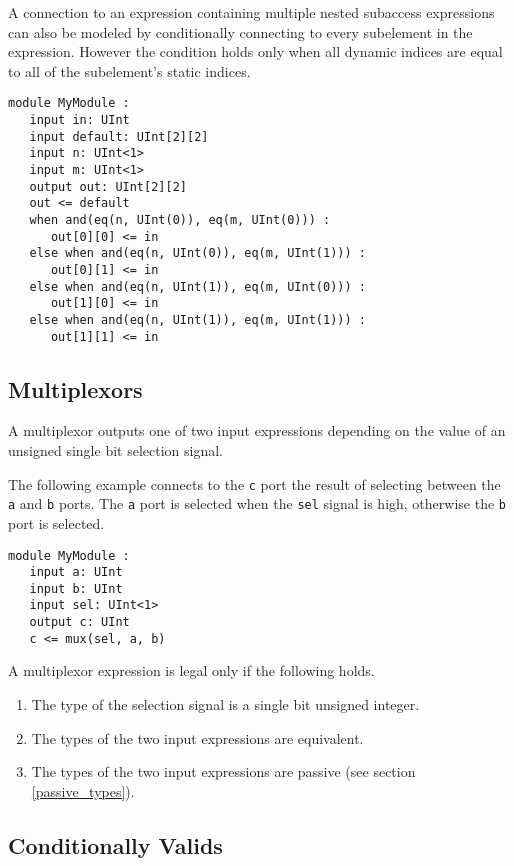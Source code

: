 \documentclass[12pt]{article}
\begin{document}
A connection to an expression containing multiple nested subaccess expressions can also be modeled by conditionally connecting to every subelement in the expression. However the condition holds only when all dynamic indices are equal to all of the subelement's static indices.
\begin{lstlisting}
module MyModule :
   input in: UInt
   input default: UInt[2][2]
   input n: UInt<1>
   input m: UInt<1>
   output out: UInt[2][2]
   out <= default
   when and(eq(n, UInt(0)), eq(m, UInt(0))) :
      out[0][0] <= in
   else when and(eq(n, UInt(0)), eq(m, UInt(1))) :
      out[0][1] <= in
   else when and(eq(n, UInt(1)), eq(m, UInt(0))) :
      out[1][0] <= in
   else when and(eq(n, UInt(1)), eq(m, UInt(1))) :
      out[1][1] <= in                  
\end{lstlisting}

\subsection{Multiplexors}\label{multiplexors}

A multiplexor outputs one of two input expressions depending on the value of an unsigned single bit selection signal. 

The following example connects to the \verb|c| port the result of selecting between the \verb|a| and \verb|b| ports. The \verb|a| port is selected when the \verb|sel| signal is high, otherwise the \verb|b| port is selected.
\begin{lstlisting}
module MyModule :
   input a: UInt
   input b: UInt
   input sel: UInt<1>   
   output c: UInt
   c <= mux(sel, a, b)
\end{lstlisting}

A multiplexor expression is legal only if the following holds.
\begin{enumerate}
\item The type of the selection signal is a single bit unsigned integer.
\item The types of the two input expressions are equivalent.
\item The types of the two input expressions are passive (see section \ref{passive_types}).
\end{enumerate}

\subsection{Conditionally Valids} \label{conditionally_valids}
\end{document}
